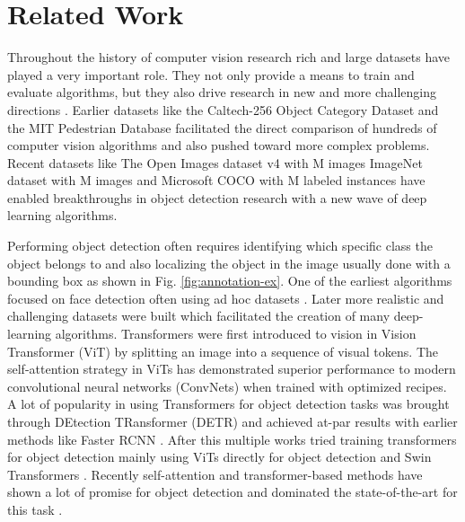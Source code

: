 \documentclass{article}
\begin{document}
\section{Related Work}
\label{Related Work}

Throughout the history of computer vision research rich and large datasets have played a very important role. They not only provide a means to train and evaluate algorithms, but they also drive research in new and more challenging directions \cite{lin2014microsoft}. Earlier datasets like the Caltech-256 Object Category Dataset \cite{griffin2007caltech} and the MIT Pedestrian Database \cite{papageorgiou2000trainable} facilitated the direct comparison of hundreds of computer vision algorithms and also pushed toward more complex problems. Recent datasets like The Open Images dataset v4 with  M images \cite{kuznetsova2020} ImageNet dataset \cite{deng2009imagenet} with  M images and Microsoft COCO with  M labeled instances \cite{lin2014microsoft} have enabled breakthroughs in object detection research with a new wave of deep learning algorithms.

Performing object detection often requires identifying which specific class the object belongs to and also localizing the object in the image usually done with a bounding box as shown in Fig. \ref{fig:annotation-ex}. One of the earliest algorithms focused on face detection often using ad hoc datasets \cite{hjelmaas2001face}. Later more realistic and challenging datasets were built which facilitated the creation of many deep-learning algorithms. Transformers \cite{vaswani2017attention} were first introduced to vision in Vision Transformer (ViT) \cite{dosovitskiy2020image} by splitting an image into a sequence of visual tokens. The self-attention strategy in ViTs has demonstrated superior performance to modern convolutional neural networks (ConvNets) when trained with optimized recipes. A lot of popularity in using Transformers for object detection tasks was brought through DEtection TRansformer (DETR) \cite{carion2020end} and achieved at-par results with earlier methods like Faster RCNN \cite{7485869}. After this multiple works tried training transformers for object detection mainly using ViTs directly for object detection \cite{dosovitskiy2020image} and Swin Transformers \cite{liu2021swin}. Recently self-attention and transformer-based methods have shown a lot of promise for object detection and dominated the state-of-the-art for this task \cite{Liu_2022_CVPR,https://doi.org/10.48550/arxiv.2203.03605,https://doi.org/10.48550/arxiv.2205.14141,https://doi.org/10.48550/arxiv.2211.03594,https://doi.org/10.48550/arxiv.2211.12860}.
\end{document}
